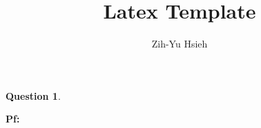 \documentclass{article}
\title{Latex Template}
\author{Zih-Yu Hsieh}
\newtheorem{question}{Question}
\begin{document}
\maketitle

\section{}
\begin{question}\label{q1}
\end{question}

\textbf{Pf:}

\break
\end{document}
